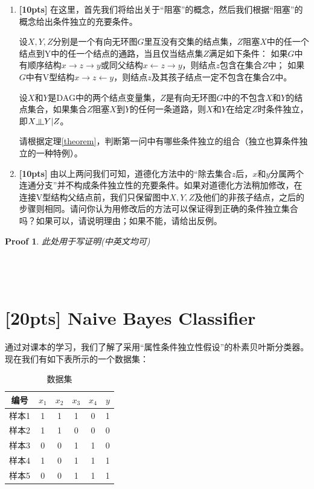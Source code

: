 \documentclass[a4paper,UTF8]{article}
\numberwithin{equation}{section}
\newtheorem*{myProof}{Proof}
\newcommand{\indep}{\rotatebox[origin=c]{90}{$\models$}}
\begin{document}
\begin{enumerate}[(1)]
\item \textbf{[10pts]} 在这里，首先我们将给出关于“阻塞”的概念，然后我们根据“阻塞”的概念给出条件独立的充要条件。
\begin{def-box}[阻塞]
设$X,Y,Z$分别是一个有向无环图$G$里互没有交集的结点集，$Z$阻塞$X$中的任一个结点到Y中的任一个结点的通路，当且仅当结点集$Z$满足如下条件：
如果$G$中有顺序结构$x\rightarrow z\rightarrow y$或同父结构$x\leftarrow z\rightarrow y$，则结点$z$包含在集合$Z$中；
如果$G$中有V型结构$x\rightarrow z \leftarrow y$，则结点$z$及其孩子结点一定不包含在集合Z中。
\end{def-box}
\begin{theorem}[条件独立]
\label{theorem}
设$X$和$Y$是{\rm DAG}中的两个结点变量集，$Z$是有向无环图$G$中的不包含$X$和$Y$的结点集合，如果集合$Z$阻塞$X$到$Y$的任何一条道路，则$X$和$Y$在给定$Z$时条件独立，即$X\indep Y|Z$。
\end{theorem}
请根据定理\ref{theorem}，判断第一问中有哪些条件独立的组合（独立也算条件独立的一种特例）。

\item \textbf{[10pts]} 由以上两问我们可知，道德化方法中的“除去集合$z$后，$x$和$y$分属两个连通分支”并不构成条件独立性的充要条件。如果对道德化方法稍加修改，在连接V型结构父结点前，我们只保留图中$X,Y,Z$及他们的非孩子结点，之后的步骤则相同。请问你认为用修改后的方法可以保证得到{\color{red}{全部的}}正确的条件独立集合吗？如果可以，请说明理由；如果不能，请给出反例。

\end{enumerate}
\begin{myProof}
	此处用于写证明(中英文均可)
	~\\
	~\\
	~\\
	~\\

\end{myProof}
\newpage
\section{[20pts] Naive Bayes Classifier}
	
	通过对课本的学习，我们了解了采用“属性条件独立性假设”的朴素贝叶斯分类器。现在我们有如下表所示的一个数据集：
	\begin{table}[htp]
		\centering
		\caption{数据集}\label{tab:aStrangeTable}
	\begin{tabular}{c|ccccc}
		\hline 
	编号	& $x_1$ & $x_2$ & $x_3$ & $x_4$ & $y$ \\ 
		\hline 
	样本1	& 1 & 1 & 1 & 0 & 1 \\ 
		\hline 
	样本2	& 1 & 1 & 0 & 0 & 0 \\ 
		\hline 
	样本3	& 0 & 0 & 1 & 1 & 0 \\ 
		\hline 
	样本4	& 1 & 0 & 1 & 1 & 1 \\ 
		\hline 
	样本5	& 0 & 0 & 1 & 1 & 1 \\ 
		\hline 
	\end{tabular}
	\end{table} 
	
\end{document}
